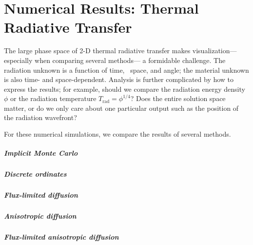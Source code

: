 
\chapter{Numerical Results: Thermal Radiative Transfer}
\label{chap:trtNumericalResults}

The large phase space of 2-D thermal radiative transfer makes visualization---%
especially when comparing several methods---%
a formidable challenge. The radiation unknown is a function of time, \xy\
space, and angle; the material unknown is also time- and space-dependent.
Analysis is further complicated by how to express the results; for example,
should we compare the radiation energy density $\phi$ or
the radiation temperature $T_\text{rad}=\phi^{1/4}$? Does the entire solution
space matter, or do we only care about one particular output such as the
position of the radiation wavefront?



For these numerical simulations, we compare the results of several methods.

\paragraph{Implicit Monte Carlo}

\paragraph{Discrete ordinates}

\paragraph{Flux-limited diffusion}

\paragraph{Anisotropic diffusion}

\paragraph{Flux-limited anisotropic diffusion}

